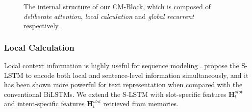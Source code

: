 \documentclass[11pt,a4paper]{article}
\begin{document}
\begin{figure}[t!]
\begin{center}
      \vspace{-5pt}
      \caption{
      The internal structure of our CM-Block,
      which is composed of \emph{deliberate attention}, \emph{local calculation} and  \emph{global recurrent} respectively.
      } 
      \label{recurrent_details}  
 \end{center}
\end{figure}

\subsubsection*{Local Calculation}
Local context information is highly useful for sequence modeling \cite{local_window_2016,local_window2_2016}. 
\citeauthor{SLSTM_2018}  propose the S-LSTM to encode both local and sentence-level information simultaneously, and it has been shown more powerful for text representation when compared with the conventional BiLSTMs.
We extend the S-LSTM with slot-specific features $\mathbf{H}_t^{slot}$ and intent-specific features $\mathbf{H}_t^{slot}$ retrieved from memories.
\end{document}
